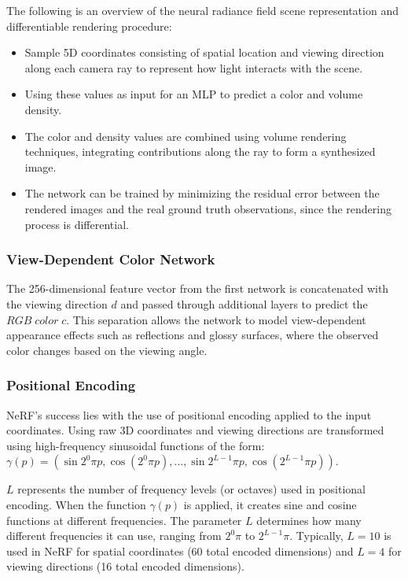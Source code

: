 \documentclass[conference]{IEEEtran}
\begin{document}
The following is an overview of the neural radiance field scene representation and differentiable rendering procedure:
\begin{itemize}
    \item Sample 5D coordinates consisting of spatial location and viewing direction along each camera ray to represent how light interacts with the scene.
    \item Using these values as input for an MLP to predict a color and volume density.
    \item The color and density values are combined using volume rendering techniques, integrating contributions along the ray to form a synthesized image.
    \item The network can be trained by minimizing the residual error between the rendered images and the real ground truth observations, since the rendering process is differential. ~\cite{nerf_paper_p5}
\end{itemize}

\subsubsection{View-Dependent Color Network}

The 256-dimensional feature vector from the first network is concatenated with the viewing direction $d$ and passed through additional layers to predict the $RGB\;color\;c$. This separation allows the network to model view-dependent appearance effects such as reflections and glossy surfaces, where the observed color changes based on the viewing angle. ~\cite{nerf_paper_p6}

\subsubsection{Positional Encoding}

NeRF's success lies with the use of positional encoding applied to the input coordinates. Using raw 3D coordinates and viewing directions are transformed using high-frequency sinusoidal functions of the form: $\gamma(p) = (\sin{2^0 \pi p}, \cos{(2^0 \pi p)}, ..., \sin{2^{L-1} \pi p}, \cos{(2^{L-1} \pi p)})$.~\cite{nerf_paper_p7}

$L$ represents the number of frequency levels (or octaves) used in positional encoding. When the function $\gamma(p)$ is applied, it creates sine and cosine functions at different frequencies. The parameter $L$ determines how many different frequencies it can use, ranging from $2^0\pi$ to $2^{L-1}\pi$. Typically, $L=10$ is used in NeRF for spatial coordinates (60 total encoded dimensions) and $L=4$ for viewing directions (16 total encoded dimensions).~\cite{nerf_paper_p7}~\cite{nerf_paper_p8}
\end{document}
